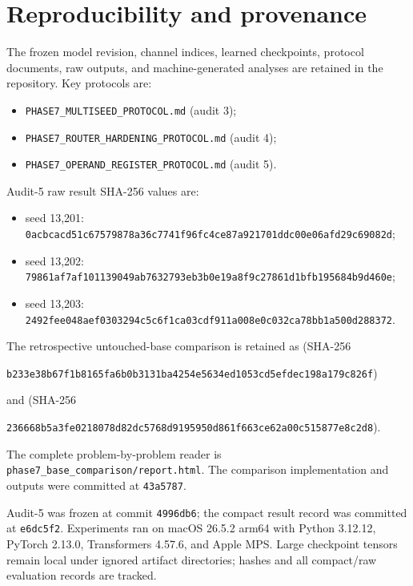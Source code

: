 \documentclass[11pt]{article}
\newcommand{\code}[1]{\texttt{#1}}
\begin{document}
\section{Reproducibility and provenance}

The frozen model revision, channel indices, learned checkpoints, protocol
documents, raw outputs, and machine-generated analyses are retained in the
repository. Key protocols are:

\begin{itemize}
\item \code{PHASE7\_MULTISEED\_PROTOCOL.md} (audit 3);
\item \code{PHASE7\_ROUTER\_HARDENING\_PROTOCOL.md} (audit 4);
\item \code{PHASE7\_OPERAND\_REGISTER\_PROTOCOL.md} (audit 5).
\end{itemize}

Audit-5 raw result SHA-256 values are:

\begin{sloppypar}
\begin{itemize}
\item seed 13,201:
\code{0acbcacd51c67579878a36c7741f96fc4ce87a921701ddc00e06afd29c69082d};
\item seed 13,202:
\code{79861af7af101139049ab7632793eb3b0e19a8f9c27861d1bfb195684b9d460e};
\item seed 13,203:
\code{2492fee048aef0303294c5c6f1ca03cdf911a008e0c032ca78bb1a500d288372}.
\end{itemize}
\end{sloppypar}

The retrospective untouched-base comparison is retained as
 (SHA-256
\begin{sloppypar}
\code{b233e38b67f1b8165fa6b0b3131ba4254e5634ed1053cd5efdec198a179c826f})
\end{sloppypar}
and  (SHA-256
\begin{sloppypar}
\code{236668b5a3fe0218078d82dc5768d9195950d861f663ce62a00c515877e8c2d8}).
\end{sloppypar}
The complete problem-by-problem reader is
\code{phase7\_base\_comparison/report.html}. The comparison implementation and
outputs were committed at \code{43a5787}.

Audit-5 was frozen at commit \code{4996db6}; the compact result record was
committed at \code{e6dc5f2}. Experiments ran on macOS 26.5.2 arm64 with
Python 3.12.12, PyTorch 2.13.0, Transformers 4.57.6, and Apple MPS. Large
checkpoint tensors remain local under ignored artifact directories; hashes and
all compact/raw evaluation records are tracked.
\end{document}
